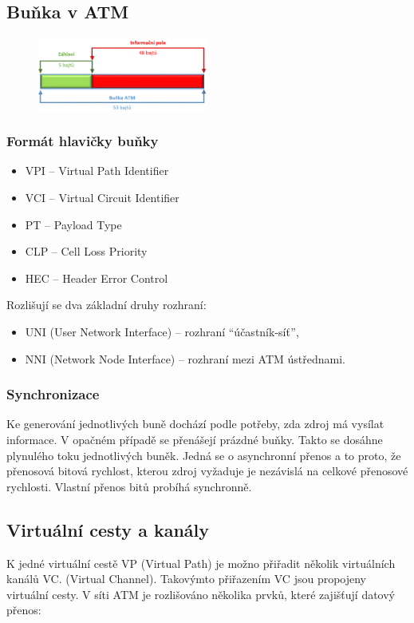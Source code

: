 \subsection{Buňka v ATM}
\begin{figure} [h]
    \centering
    \includegraphics[width=0.5\textwidth]{snimky/ATM bunka.png}
    \label{fig:atm-bunka}
\end{figure}

\subsubsection{Formát hlavičky buňky}
\begin{itemize}
    \item VPI -- Virtual Path Identifier
    \item VCI -- Virtual Circuit Identifier
    \item PT -- Payload Type
    \item CLP -- Cell Loss Priority
    \item HEC -- Header Error Control
\end{itemize}

Rozlišují se dva základní druhy rozhraní:
\begin{itemize}
    \item UNI (User Network Interface) -- rozhraní \enquote{účastník-síť},
    \item NNI (Network Node Interface) -- rozhraní mezi ATM ústřednami.
\end{itemize}

\subsubsection{Synchronizace}
Ke generování jednotlivých buně dochází podle potřeby, zda zdroj má vysílat informace. V opačném případě se přenášejí prázdné buňky. Takto se dosáhne
plynulého toku jednotlivých buněk. Jedná se o asynchronní přenos a to proto, že přenosová bitová rychlost, kterou zdroj vyžaduje je nezávislá na celkové přenosové rychlosti.  Vlastní přenos bitů probíhá synchronně.

\subsection{Virtuální cesty a kanály}
K jedné virtuální cestě VP (Virtual Path) je možno přiřadit několik virtuálních kanálů VC. (Virtual Channel). Takovýmto přiřazením VC jsou propojeny virtuální cesty. V síti ATM je rozlišováno několika prvků, které zajišťují datový přenos:

